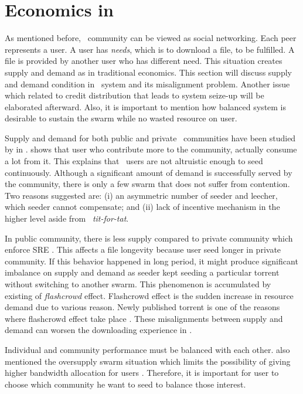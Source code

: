 \chapter{Economics in \bt}

As mentioned before, \bt~community can be viewed as social networking. Each peer represents a user. A user has \textit{needs}, which is to download a file, to be fulfilled. A file is provided by another user who has different need. This situation creates supply and demand as in traditional economics. This section will discuss supply and demand condition in \bt~system and its misalignment problem. Another issue which related to credit distribution that leads to system seize-up will be elaborated afterward. Also, it is important to mention how balanced system is desirable to sustain the swarm while no wasted resource on user.

Supply and demand for both public and private \bt~communities have been studied by \citeauthor{2009:demandsupplyres:andrade} in \citeyear{2009:demandsupplyres:andrade}. \citeauthor{2009:demandsupplyres:andrade} shows that user who contribute more to the community, actually consume a lot from it. This explains that \bt~users are not altruistic enough to seed continuously. Although a significant amount of demand is successfully served by the community, there is only a few swarm that does not suffer from contention. Two reasons \citeauthor{2009:demandsupplyres:andrade} suggested are: (i) an asymmetric number of seeder and leecher, which seeder cannot compensate; and (ii) lack of incentive mechanism in the higher level aside from \bt~\textit{tit-for-tat}. 

In public community, there is less supply compared to private community which enforce SRE \cite{2009:demandsupplyres:andrade}. This affects a file longevity because user seed longer in private community. If this behavior happened in long period, it might produce significant imbalance on supply and demand as seeder kept seeding a particular torrent without switching to another swarm. This phenomenon is accumulated by existing of \textit{flashcrowd} effect. Flashcrowd effect is the sudden increase in resource demand due to various reason. Newly published torrent is one of the reasons where flashcrowd effect take place \cite{2013:swarmevolution:su}. These misalignments between supply and demand can worsen the downloading experience in \bt.

Individual and community performance must be balanced with each other.   \citeauthor{2013:survivepriv:jia} also mentioned the oversupply swarm situation which limits the possibility of giving higher bandwidth allocation for users \cite{2013:survivepriv:jia}. Therefore, it is important for user to choose which community he want to seed to balance those interest.

